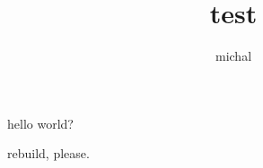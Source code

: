 \documentclass{article}
\title{test}
\author{michal}
\begin{document}
\maketitle
hello world?

rebuild, please.
\end{document}
